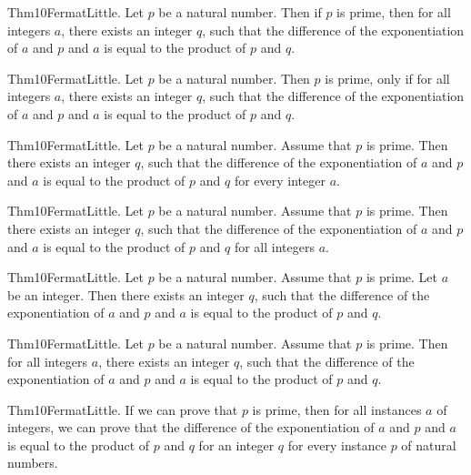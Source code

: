 \documentclass{article}
\begin{document}
Thm10FermatLittle. Let $p$ be a natural number. Then if $p$ is prime, then for all integers $a$, there exists an integer $q$, such that the difference of the exponentiation of $a$ and $p$ and $a$ is equal to the product of $p$ and $q$.

Thm10FermatLittle. Let $p$ be a natural number. Then $p$ is prime, only if for all integers $a$, there exists an integer $q$, such that the difference of the exponentiation of $a$ and $p$ and $a$ is equal to the product of $p$ and $q$.

Thm10FermatLittle. Let $p$ be a natural number. Assume that $p$ is prime. Then there exists an integer $q$, such that the difference of the exponentiation of $a$ and $p$ and $a$ is equal to the product of $p$ and $q$ for every integer $a$.

Thm10FermatLittle. Let $p$ be a natural number. Assume that $p$ is prime. Then there exists an integer $q$, such that the difference of the exponentiation of $a$ and $p$ and $a$ is equal to the product of $p$ and $q$ for all integers $a$.

Thm10FermatLittle. Let $p$ be a natural number. Assume that $p$ is prime. Let $a$ be an integer. Then there exists an integer $q$, such that the difference of the exponentiation of $a$ and $p$ and $a$ is equal to the product of $p$ and $q$.

Thm10FermatLittle. Let $p$ be a natural number. Assume that $p$ is prime. Then for all integers $a$, there exists an integer $q$, such that the difference of the exponentiation of $a$ and $p$ and $a$ is equal to the product of $p$ and $q$.

Thm10FermatLittle. If we can prove that $p$ is prime, then for all instances $a$ of integers, we can prove that the difference of the exponentiation of $a$ and $p$ and $a$ is equal to the product of $p$ and $q$ for an integer $q$ for every instance $p$ of natural numbers.
\end{document}
